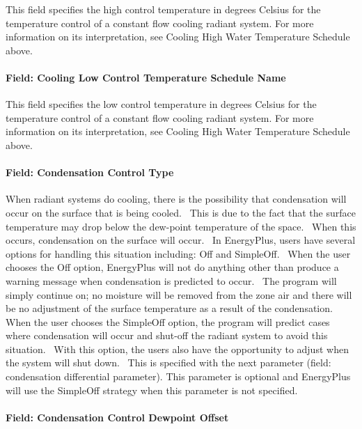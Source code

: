 This field specifies the high control temperature in degrees Celsius for the temperature control of a constant flow cooling radiant system. For more information on its interpretation, see Cooling High Water Temperature Schedule above.

\paragraph{Field: Cooling Low Control Temperature Schedule Name}\label{field-cooling-low-control-temperature-schedule-name}

This field specifies the low control temperature in degrees Celsius for the temperature control of a constant flow cooling radiant system. For more information on its interpretation, see Cooling High Water Temperature Schedule above.

\paragraph{Field: Condensation Control Type}\label{field-condensation-control-type-1}

When radiant systems do cooling, there is the possibility that condensation will occur on the surface that is being cooled.~ This is due to the fact that the surface temperature may drop below the dew-point temperature of the space.~ When this occurs, condensation on the surface will occur.~ In EnergyPlus, users have several options for handling this situation including: Off and SimpleOff.~ When the user chooses the Off option, EnergyPlus will not do anything other than produce a warning message when condensation is predicted to occur.~ The program will simply continue on; no moisture will be removed from the zone air and there will be no adjustment of the surface temperature as a result of the condensation.~ When the user chooses the SimpleOff option, the program will predict cases where condensation will occur and shut-off the radiant system to avoid this situation.~ With this option, the users also have the opportunity to adjust when the system will shut down.~ This is specified with the next parameter (field: condensation differential parameter). This parameter is optional and EnergyPlus will use the SimpleOff strategy when this parameter is not specified.

\paragraph{Field: Condensation Control Dewpoint Offset}\label{field-condensation-control-dewpoint-offset-1}

